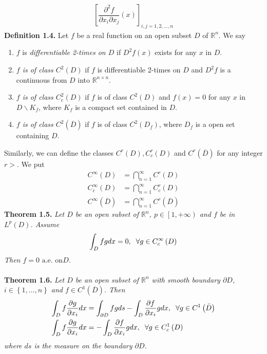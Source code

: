 \documentclass[a4paper]{article}
\numberwithin{equation}{section}
\begin{document}
\begin{align}
{\left[ {\dfrac{{{\partial ^2}f}}{{\partial {x_i}\partial {x_j}}}\left( x \right)} \right]_{i,j = 1,2, \ldots ,n}}
\end{align}
\textbf{Definition 1.4.} Let $f$ be a real function on an open subset $D$ of $\mathbb{R}^n$. We say
\begin{enumerate}
\item $f$ is \textit{differentiable 2-times on $D$} if $D^2 f\left(x\right)$ exists for any $x$ in $D$.
\item \textit{$f$ is of class $C^2\left(D\right)$} if $f$ is differentiable 2-times on $D$ and $D^2f$ is a continuous from $D$ into $\mathbb{R}^{n\times n}$.
\item \textit{$f$ is of class $C_c^2\left( D \right)$} if $f$ is of class $C^2\left(D\right)$ and $f\left(x\right)=0$ for any $x$ in $D\backslash {K_f}$, where $K_f$ is a compact set contained in $D$. 
\item \textit{$f$ is of class ${C^2}\left( {\overline D} \right)$} if $f$ is of class $C^2\left(D_f\right)$, where $D_f$ is a open set containing $D$.
\end{enumerate}

Similarly, we can define the classes ${C^r}\left( D \right),C_c^r\left( D \right)$ and ${C^r}\left( {\overline D} \right)$ for any integer $r>$. We put
\begin{align}
{C^\infty }\left( D \right) &= \bigcap\limits_{n = 1}^\infty  {{C^r}\left( D \right)} \\
C_c^\infty \left( D \right) &= \bigcap\limits_{n = 1}^\infty  {C_c^r\left( D \right)} \\
{C^\infty }\left( {\overline D} \right) &= \bigcap\limits_{n = 1}^\infty  {{C^r}\left( {\overline D} \right)} 
\end{align}
\textbf{Theorem 1.5.} \textit{Let $D$ be an open subset of $\mathbb{R}^n$, $p \in \left[ {1, + \infty } \right)$ and $f$ be in $L^p\left(D\right)$. Assume}
\begin{align}
\int_D {fgdx}  = 0,\hspace{0.2cm}\forall g \in C_c^\infty \left( D \right)
\end{align}
\textit{Then $f=0 \mbox{ a.e. on} D$.}\\
\\
\textbf{Theorem 1.6.} \textit{Let $D$ be an open subset of $\mathbb{R}^n$ with smooth boundary $\partial D$, $i \in \left\{ {1, \ldots ,n} \right\}$ and $f \in {C^1}\left( {\overline D} \right)$. Then}
\begin{align}
\int_D {f\dfrac{{\partial g}}{{\partial {x_i}}}dx}  &= \int_{\partial D} {fgds}  - \int_D {\dfrac{{\partial f}}{{\partial {x_i}}}gdx} ,\hspace{0.2cm}\forall g \in {C^1}\left( {\bar D} \right)\\
\int_D {f\dfrac{{\partial g}}{{\partial {x_i}}}dx}  &=  - \int_D {\dfrac{{\partial f}}{{\partial {x_i}}}gdx} ,\hspace{0.2cm}\forall g \in C_c^1\left( D \right)
\end{align}
\textit{where $ds$ is the measure on the boundary $\partial D$.}\\
\end{document}
